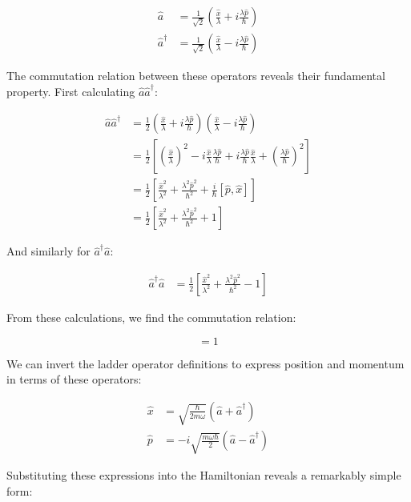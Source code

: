 \documentclass[italian]{HKNdocument}
\begin{document}
\begin{align}
\hat{a} &= \frac{1}{\sqrt{2}}\left(\frac{\hat{x}}{\lambda} + i\frac{\lambda\hat{p}}{\hbar}\right)  \\
\hat{a}^\dagger &= \frac{1}{\sqrt{2}}\left(\frac{\hat{x}}{\lambda} - i\frac{\lambda\hat{p}}{\hbar}\right)
\end{align}

The commutation relation between these operators reveals their fundamental property. First calculating $\hat{a}\hat{a}^\dagger$:

\begin{align}
\hat{a}\hat{a}^\dagger &= \frac{1}{2}\left(\frac{\hat{x}}{\lambda} + i\frac{\lambda\hat{p}}{\hbar}\right)\left(\frac{\hat{x}}{\lambda} - i\frac{\lambda\hat{p}}{\hbar}\right) \\
&= \frac{1}{2}\left[\left(\frac{\hat{x}}{\lambda}\right)^2 - i\frac{\hat{x}}{\lambda}\frac{\lambda\hat{p}}{\hbar} + i\frac{\lambda\hat{p}}{\hbar}\frac{\hat{x}}{\lambda} + \left(\frac{\lambda\hat{p}}{\hbar}\right)^2\right] \\
&= \frac{1}{2}\left[\frac{\hat{x}^2}{\lambda^2} + \frac{\lambda^2\hat{p}^2}{\hbar^2} + \frac{i}{\hbar}[\hat{p},\hat{x}]\right]  \\
&= \frac{1}{2}\left[\frac{\hat{x}^2}{\lambda^2} + \frac{\lambda^2\hat{p}^2}{\hbar^2} + 1\right]
\end{align}

And similarly for $\hat{a}^\dagger\hat{a}$:

\begin{align}
\hat{a}^\dagger\hat{a} &= \frac{1}{2}\left[\frac{\hat{x}^2}{\lambda^2} + \frac{\lambda^2\hat{p}^2}{\hbar^2} - 1\right]
\end{align}

From these calculations, we find the commutation relation:

\begin{equation}
[a,a^\dagger] = 1
\end{equation}

We can invert the ladder operator definitions to express position and momentum in terms of these operators:

\begin{align}
\hat{x} &= \sqrt{\frac{\hbar}{2m\omega}}(\hat{a} + \hat{a}^\dagger) \\
\hat{p} &= -i\sqrt{\frac{m\omega\hbar}{2}}(\hat{a} - \hat{a}^\dagger)
\end{align}

Substituting these expressions into the Hamiltonian reveals a remarkably simple form:
\end{document}
